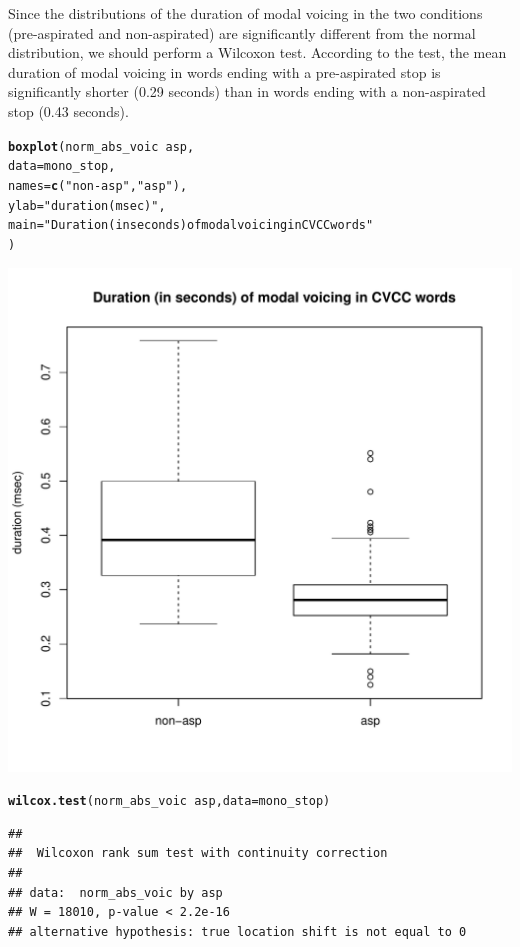 \documentclass[a4paper,11pt]{article}\usepackage[]{graphicx}\usepackage[]{color}
\makeatletter
\def\maxwidth{ %
  \ifdim\Gin@nat@width>\linewidth
    \linewidth
  \else
    \Gin@nat@width
  \fi
}
\newcommand{\hlstr}[1]{\textcolor[rgb]{0.192,0.494,0.8}{#1}}%
\newcommand{\hlopt}[1]{\textcolor[rgb]{0,0,0}{#1}}%
\newcommand{\hlstd}[1]{\textcolor[rgb]{0.345,0.345,0.345}{#1}}%
\newcommand{\hlkwc}[1]{\textcolor[rgb]{0.333,0.667,0.333}{#1}}%
\newcommand{\hlkwd}[1]{\textcolor[rgb]{0.737,0.353,0.396}{\textbf{#1}}}%
\newenvironment{kframe}{%
 \def\at@end@of@kframe{}%
 \ifinner\ifhmode%
  \def\at@end@of@kframe{\end{minipage}}%
  \begin{minipage}{\columnwidth}%
 \fi\fi%
 \def\FrameCommand##1{\hskip\@totalleftmargin \hskip-\fboxsep
 \colorbox{shadecolor}{##1}\hskip-\fboxsep
     \hskip-\linewidth \hskip-\@totalleftmargin \hskip\columnwidth}%
 \MakeFramed {\advance\hsize-\width
   \@totalleftmargin\z@ \linewidth\hsize
   \@setminipage}}%
 {\par\unskip\endMakeFramed%
 \at@end@of@kframe}
\newenvironment{knitrout}{}{} %
\makeatother
\begin{document}
Since the distributions of the duration of modal voicing in the two conditions (pre-aspirated and non-aspirated) are significantly different from the normal distribution, we should perform a Wilcoxon test.
According to the test, the mean duration of modal voicing in words ending with a pre-aspirated stop is significantly shorter (0.29 seconds) than in words ending with a non-aspirated stop (0.43 seconds).

\begin{knitrout}
\color{fgcolor}\begin{kframe}
\begin{alltt}
\hlkwd{boxplot}\hlstd{(norm_abs_voic} \hlopt{~} \hlstd{asp,}
        \hlkwc{data} \hlstd{= mono_stop,}
        \hlkwc{names} \hlstd{=} \hlkwd{c}\hlstd{(}\hlstr{"non-asp"}\hlstd{,} \hlstr{"asp"}\hlstd{),}
        \hlkwc{ylab} \hlstd{=} \hlstr{"duration (msec)"}\hlstd{,}
        \hlkwc{main} \hlstd{=} \hlstr{"Duration (in seconds) of modal voicing in CVCC words"}
        \hlstd{)}
\end{alltt}
\end{kframe}
\includegraphics[width=\maxwidth]{img/mono-stop-box-1} 
\begin{kframe}\begin{alltt}
\hlkwd{wilcox.test}\hlstd{(norm_abs_voic} \hlopt{~} \hlstd{asp,} \hlkwc{data} \hlstd{= mono_stop)}
\end{alltt}
\begin{verbatim}
## 
## 	Wilcoxon rank sum test with continuity correction
## 
## data:  norm_abs_voic by asp
## W = 18010, p-value < 2.2e-16
## alternative hypothesis: true location shift is not equal to 0
\end{verbatim}
\end{kframe}
\end{knitrout}
\end{document}
